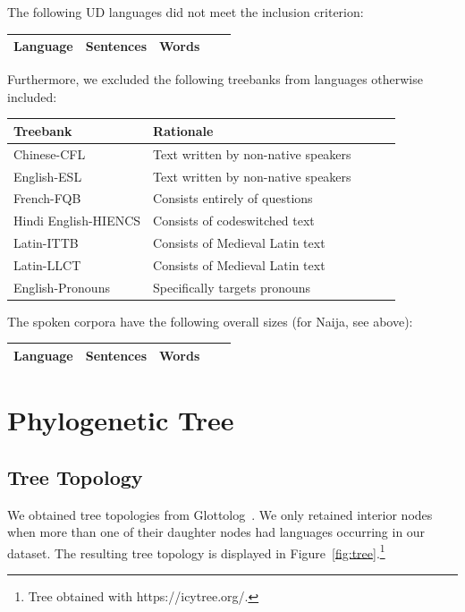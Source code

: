 \documentclass[11pt,a4paper]{article}
\begin{document}
The following UD languages did not meet the inclusion criterion:

\begin{longtable}{lllll}
Language & Sentences & Words \\ \hline

\end{longtable}


Furthermore, we excluded the following treebanks from languages otherwise included:

\begin{tabular}{lllll}
Treebank & Rationale \\ \hline
Chinese-CFL & Text written by non-native speakers\\
English-ESL & Text written by non-native speakers \\
French-FQB & Consists entirely of questions \\
Hindi English-HIENCS &  Consists of codeswitched text \\
Latin-ITTB & Consists of Medieval Latin text \\
Latin-LLCT & Consists of Medieval Latin text  \\
English-Pronouns & Specifically targets pronouns \\
\end{tabular}



The spoken corpora have the following overall sizes (for Naija, see above):

\begin{longtable}{lllll}
Language & Sentences & Words \\ \hline



\end{longtable}

\section{Phylogenetic Tree}

\subsection{Tree Topology}

We obtained tree topologies from Glottolog~\citep{nordhoff2011glottolog}.
We only retained interior nodes when more than one of their daughter nodes had languages occurring in our dataset.
The resulting tree topology is displayed in Figure~\ref{fig:tree}.\footnote{Tree obtained with https://icytree.org/.}
\end{document}

